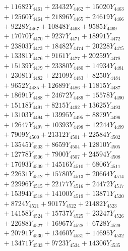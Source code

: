 \documentclass[a4paper,10pt]{article}
\begin{document}
{\begin{align}
&\;  + 11682 Y_{4461} + 23432 Y_{4462} + 15020 Y_{4463} \\[0.3ex]
&\;  + 12560 Y_{4464} + 21896 Y_{4465} + 24619 Y_{4466} \\[0.3ex]
&\;  + 9228 Y_{4467} + 10848 Y_{4468} + 9585 Y_{4469} \\[0.5ex]\allowbreak
&\;  + 17070 Y_{4470} + 9237 Y_{4471} + 18991 Y_{4472} \\[0.3ex]
&\;  + 23803 Y_{4473} + 18482 Y_{4474} + 20228 Y_{4475} \\[0.3ex]
&\;  + 13381 Y_{4476} + 9161 Y_{4477} + 20259 Y_{4478} \\[0.3ex]
&\;  + 15139 Y_{4479} + 23380 Y_{4480} + 14934 Y_{4481} \\[0.3ex]
&\;  + 23081 Y_{4482} + 22109 Y_{4483} + 8250 Y_{4484} \\[0.3ex]
&\;  + 9652 Y_{4485} + 12689 Y_{4486} + 11815 Y_{4487} \\[0.3ex]
&\;  + 18691 Y_{4488} + 24672 Y_{4489} + 15578 Y_{4490} \\[0.3ex]
&\;  + 15118 Y_{4491} + 8215 Y_{4492} + 13625 Y_{4493} \\[0.3ex]
&\;  + 13103 Y_{4494} + 13995 Y_{4495} + 8879 Y_{4496} \\[0.3ex]
&\;  + 12647 Y_{4497} + 10393 Y_{4498} + 12244 Y_{4499} \\[0.5ex]\allowbreak
&\;  + 7909 Y_{4500} + 21312 Y_{4501} + 22584 Y_{4502} \\[0.3ex]
&\;  + 13545 Y_{4503} + 8659 Y_{4504} + 12810 Y_{4505} \\[0.3ex]
&\;  + 12778 Y_{4506} + 7900 Y_{4507} + 24594 Y_{4508} \\[0.3ex]
&\;  + 17693 Y_{4509} + 14516 Y_{4510} + 6806 Y_{4511} \\[0.3ex]
&\;  + 22631 Y_{4512} + 15780 Y_{4513} + 20664 Y_{4514} \\[0.3ex]
&\;  + 22996 Y_{4515} + 22177 Y_{4516} + 24472 Y_{4517} \\[0.3ex]
&\;  + 15394 Y_{4518} + 14100 Y_{4519} + 13871 Y_{4520} \\[0.3ex]
&\;  + 8724 Y_{4521} + 9017 Y_{4522} + 21482 Y_{4523} \\[0.3ex]
&\;  + 14158 Y_{4524} + 15737 Y_{4525} + 23247 Y_{4526} \\[0.3ex]
&\;  + 22688 Y_{4527} + 16967 Y_{4528} + 6728 Y_{4529} \\[0.5ex]\allowbreak
&\;  + 20791 Y_{4530} + 13460 Y_{4531} + 14695 Y_{4532} \\[0.3ex]
&\;  + 13471 Y_{4533} + 9723 Y_{4534} + 14306 Y_{4535} \\[0.3ex]

\end{align}}
\end{document}
